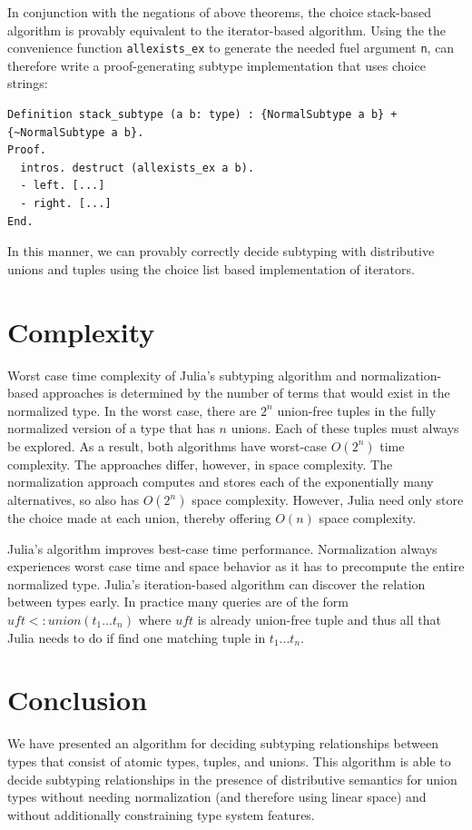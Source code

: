 \documentclass[a4paper,english]{lipics-v2019}
\begin{document}
In conjunction with the negations of above theorems, the choice stack-based algorithm is provably equivalent to the
iterator-based algorithm. Using the the convenience function \verb|allexists_ex| to generate the needed fuel argument \verb|n|,
can therefore write a proof-generating subtype implementation that uses choice strings:

\begin{verbatim}
Definition stack_subtype (a b: type) : {NormalSubtype a b} + {~NormalSubtype a b}.
Proof.
  intros. destruct (allexists_ex a b).
  - left. [...]
  - right. [...]
End.
\end{verbatim}

In this manner, we can provably correctly decide subtyping with distributive unions and tuples using
the choice list based implementation of iterators.

\section{Complexity}

Worst case time complexity of Julia's subtyping algorithm and
normalization-based approaches is determined by the number of terms that
would exist in the normalized type. In the worst case, there are $2^n$
union-free tuples in the fully normalized version of a type that has $n$
unions.  Each of these tuples must always be explored. As a result, both
algorithms have worst-case $O(2^n)$ time complexity. The approaches differ,
however, in space complexity. The normalization approach computes and stores
each of the exponentially many alternatives, so also has $O(2^n)$ space
complexity. However, Julia need only store the choice made at each union,
thereby offering $O(n)$ space complexity.

Julia's algorithm improves best-case time performance.  Normalization always
experiences worst case time and space behavior as it has to precompute the
entire normalized type. Julia's iteration-based algorithm can discover the
relation between types early. In practice many queries are of the form $uft
<: union(t_1...t_n)$ where $uft$ is already union-free tuple and thus all
that Julia needs to do if find one matching tuple in $t_1 ... t_n$.

\section{Conclusion}

We have presented an algorithm for deciding subtyping relationships between
types that consist of atomic types, tuples, and unions. This algorithm is able
to decide subtyping relationships in the presence of distributive semantics
for union types without needing normalization (and therefore using linear
space) and without additionally constraining type system features.
\end{document}
